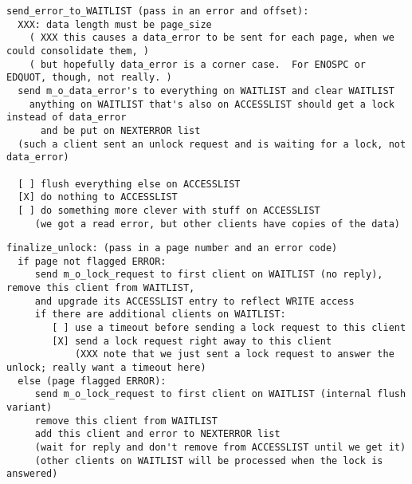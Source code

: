 \documentclass{article}
\begin{document}
\begin{verbatim}
send_error_to_WAITLIST (pass in an error and offset):
  XXX: data length must be page_size
    ( XXX this causes a data_error to be sent for each page, when we could consolidate them, )
    ( but hopefully data_error is a corner case.  For ENOSPC or EDQUOT, though, not really. )
  send m_o_data_error's to everything on WAITLIST and clear WAITLIST
    anything on WAITLIST that's also on ACCESSLIST should get a lock instead of data_error
      and be put on NEXTERROR list
  (such a client sent an unlock request and is waiting for a lock, not data_error)

  [ ] flush everything else on ACCESSLIST
  [X] do nothing to ACCESSLIST
  [ ] do something more clever with stuff on ACCESSLIST
     (we got a read error, but other clients have copies of the data)
\end{verbatim}

\begin{verbatim}
finalize_unlock: (pass in a page number and an error code)
  if page not flagged ERROR:
     send m_o_lock_request to first client on WAITLIST (no reply), remove this client from WAITLIST,
     and upgrade its ACCESSLIST entry to reflect WRITE access
     if there are additional clients on WAITLIST:
        [ ] use a timeout before sending a lock request to this client
        [X] send a lock request right away to this client
            (XXX note that we just sent a lock request to answer the unlock; really want a timeout here)
  else (page flagged ERROR):
     send m_o_lock_request to first client on WAITLIST (internal flush variant)
     remove this client from WAITLIST
     add this client and error to NEXTERROR list
     (wait for reply and don't remove from ACCESSLIST until we get it)
     (other clients on WAITLIST will be processed when the lock is answered)
\end{verbatim}
\end{document}
